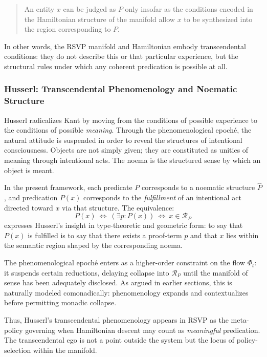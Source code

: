 \documentclass[12pt,letterpaper]{article}
\begin{document}
\begin{quote}
An entity $x$ can be judged as $P$ only insofar as the conditions encoded in
the Hamiltonian structure of the manifold allow $x$ to be synthesized into the
region corresponding to $P$.
\end{quote}

In other words, the RSVP manifold and Hamiltonian embody transcendental
conditions: they do not describe this or that particular experience, but the
structural rules under which any coherent predication is possible at all.

\subsubsection*{Husserl: Transcendental Phenomenology and Noematic Structure}

Husserl radicalizes Kant by moving from the conditions of possible experience to
the conditions of possible \emph{meaning}.  Through the phenomenological
epoché, the natural attitude is suspended in order to reveal the structures of
intentional consciousness.  Objects are not simply given; they are constituted
as unities of meaning through intentional acts.  The noema is the structured
sense by which an object is meant.

In the present framework, each predicate $P$ corresponds to a noematic
structure $\widehat{P}$, and predication $P(x)$ corresponds to the
\emph{fulfillment} of an intentional act directed toward $x$ via that structure.
The equivalence:
\[
P(x)\ \Longleftrightarrow\ (\exists p : P(x))
\ \Longleftrightarrow\ 
x \in \mathcal{R}_P
\]
expresses Husserl’s insight in type-theoretic and geometric form: to say that
$P(x)$ is fulfilled is to say that there exists a proof-term $p$ and that $x$
lies within the semantic region shaped by the corresponding noema.

The phenomenological epoché enters as a higher-order constraint on the flow
$\Phi_t$: it suspends certain reductions, delaying collapse into $\mathcal{R}_P$
until the manifold of sense has been adequately disclosed.  As argued in earlier
sections, this is naturally modeled comonadically: phenomenology expands and
contextualizes before permitting monadic collapse.

Thus, Husserl’s transcendental phenomenology appears in RSVP as the meta-policy
governing when Hamiltonian descent may count as \emph{meaningful} predication.
The transcendental ego is not a point outside the system but the locus of
policy-selection within the manifold.
\end{document}
